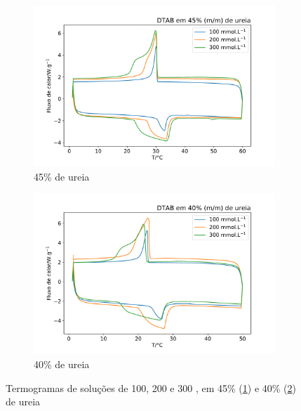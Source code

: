 	\begin{figure}[h]
		\begin{subfigure}[t]{0.5\textwidth}
			\includegraphics[width=\textwidth]{./imagens/dsc/DTAB_45p}
			\caption{45\% de ureia}
			\label{fig:DSC_DTAB_UR45}
		\end{subfigure}%
		\begin{subfigure}[t]{0.5\textwidth}
			\includegraphics[width=\textwidth]{./imagens/dsc/DTAB_40p}
			\caption{40\% de ureia}
			\label{fig:DSC_DTAB_UR40}
		\end{subfigure}
		\caption{Termogramas de soluções de \DTAB{} 100, 200 e 300 \mM{}, em 45\% (\ref{fig:DSC_DTAB_UR45}) e 40\% (\ref{fig:DSC_DTAB_UR40}) de ureia}
		\label{fig:DSC_DTAB_UR_40-45}
	\end{figure}
	
